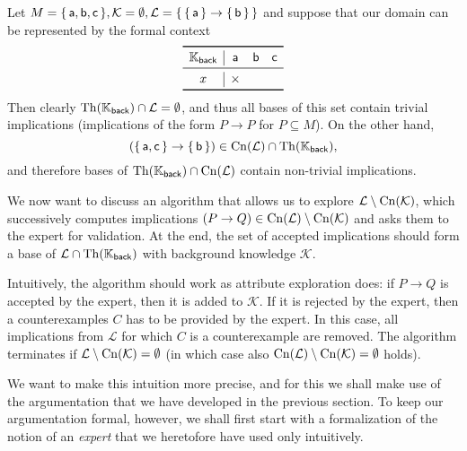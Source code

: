 \begin{Example}
  \label{expl:why-exploring-implications-is-different}
  Let $M = {\{\, \mathsf{a}, \mathsf{b}, \mathsf{c} \,\}}, \mathcal{K} = \emptyset,
  \mathcal{L} = {\{\, {\{\, \mathsf{a} \,\}} \to {\ensuremath{\{\, \mathsf{b} \,\}}} \,\}}$ and suppose that our
  domain can be represented by the formal context
  \begin{equation*}
    \begin{array}{c|ccc}
      \toprule
      \con K_{\mathsf{back}} & \mathsf{a} & \mathsf{b} & \mathsf{c} \\
      \midrule
      x & \times \\
      \bottomrule
    \end{array}
  \end{equation*}
  Then clearly $\operatorname{Th}({\mathbb{K}}_{\mathsf{back}}) \cap \mathcal{L} = \emptyset$, and thus all
  bases of this set contain trivial implications (\ie implications of the form $P \to P$
  for $P \subseteq M$).  On the other hand,
  \begin{equation*}
    ({\{\, \mathsf{a}, \mathsf{c} \,\}} \to {\ensuremath{\{\, \mathsf{b} \,\}}}) \in
    \operatorname{Cn}(\mathcal{L}) \cap \operatorname{Th}({\mathbb{K}}_{\mathsf{back}}),
  \end{equation*}
  and therefore bases of $\operatorname{Th}({\mathbb{K}}_{\mathsf{back}}) \cap \operatorname{Cn}(\mathcal{L})$ contain
  non-trivial implications.
\end{Example}

We now want to discuss an algorithm that allows us to explore $\mathcal{L} \setminus
\operatorname{Cn}(\mathcal{K})$, \ie which successively computes implications $(P \to Q) \in
\operatorname{Cn}(\mathcal{L}) \setminus \operatorname{Cn}(\mathcal{K})$ and asks them to the expert for validation.
At the end, the set of accepted implications should form a base of $\mathcal{L} \cap
\operatorname{Th}({\mathbb{K}}_{\mathsf{back}})$ with background knowledge $\mathcal{K}$.

Intuitively, the algorithm should work as attribute exploration does: if $P \to Q$ is
accepted by the expert, then it is added to $\mathcal{K}$.  If it is rejected by the
expert, then a counterexamples $C$ has to be provided by the expert.  In this case, all
implications from $\mathcal{L}$ for which $C$ is a counterexample are removed.  The
algorithm terminates if $\mathcal{L} \setminus \operatorname{Cn}(\mathcal{K}) = \emptyset$ (in which
case also $\operatorname{Cn}(\mathcal{L}) \setminus \operatorname{Cn}(\mathcal{K}) = \emptyset$ holds).

We want to make this intuition more precise, and for this we shall make use of the
argumentation that we have developed in the previous section.  To keep our argumentation
formal, however, we shall first start with a formalization of the notion of an
\emph{expert} that we heretofore have used only intuitively.


